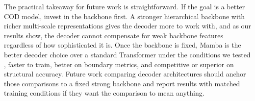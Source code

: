 \documentclass[10pt,conference]{IEEEtran}
\begin{document}
The practical takeaway for future work is straightforward. If the goal is a better COD model, invest in the backbone first. A stronger hierarchical backbone with richer multi-scale representations gives the decoder more to work with, and as our results show, the decoder cannot compensate for weak backbone features regardless of how sophisticated it is. Once the backbone is fixed, Mamba is the better decoder choice over a standard Transformer under the conditions we tested , faster to train, better on boundary metrics, and competitive or superior on structural accuracy. Future work comparing decoder architectures should anchor those comparisons to a fixed strong backbone and report results with matched training conditions if they want the comparison to mean anything.




\end{document}
